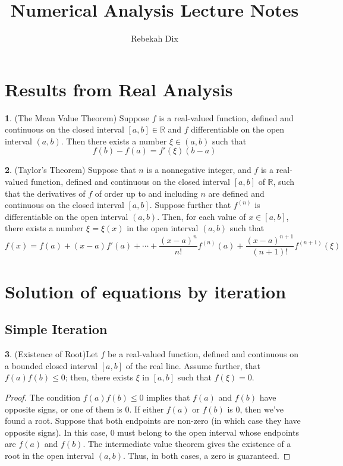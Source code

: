 \documentclass[12pt]{article}
\title{Numerical Analysis Lecture Notes}
\author{Rebekah Dix}
\theoremstyle{definition}
\newcommand{\R}{\mathbb{R}}
\newtheorem{theorem}{\color{ForestGreen}{\textbf{Theorem}}}
\theoremstyle{definition}
\begin{document}
\maketitle
\tableofcontents
\newpage 

\section{Results from Real Analysis}
\begin{theorem}(The Mean Value Theorem)
Suppose $f$ is a real-valued function, defined and continuous on the closed interval $[a,b] \in \R$ and $f$ differentiable on the open interval $(a,b)$. Then there exists a number $\xi \in (a,b)$ such that
\begin{equation}
	f(b) - f(a) = f'(\xi) (b - a)
\end{equation}
\end{theorem}

\begin{theorem}(Taylor's Theorem)
Suppose that $n$ is a nonnegative integer, and $f$ is a real-valued function, defined and continuous on the closed interval $[a,b]$ of $\R$, such that the derivatives of $f$ of order up to and including $n$ are defined and continuous on the closed interval $[a,b]$. Suppose further that $f^{(n)}$ is differentiable on the open interval $(a,b)$. Then, for each value of $x \in [a,b]$, there exists a number $\xi = \xi(x)$ in the open interval $(a,b)$ such that 
\begin{equation}
	f(x) = f(a) + (x-a)f'(a) + \cdots + \frac{(x-a)^n}{n!} f^{(n)}(a) + \frac{(x-a)^{n+1}}{(n+1)!} f^{(n+1)}(\xi)
\end{equation}
\end{theorem}

\section{Solution of equations by iteration}

\subsection{Simple Iteration}
\begin{theorem}(Existence of Root)\label{zeroexists}
Let $f$ be a real-valued function, defined and continuous on a bounded closed interval $[a,b]$ of the real line. Assume further, that $f(a)f(b) \leq 0$; then, there exists $\xi$ in $[a,b]$ such that $f(\xi) = 0$.
\end{theorem}
\begin{proof}
The condition $f(a)f(b) \leq 0$ implies that $f(a)$ and $f(b)$ have opposite signs, or one of them is $0$. If either $f(a)$ or $f(b)$ is $0$, then we've found a root. Suppose that both endpoints are non-zero (in which case they have opposite signs). In this case, $0$ must belong to the open interval whose endpoints are $f(a)$ and $f(b)$. The intermediate value theorem gives the existence of a root in the open interval $(a,b)$. Thus, in both cases, a zero is guaranteed. 
\end{proof}
\end{document}
